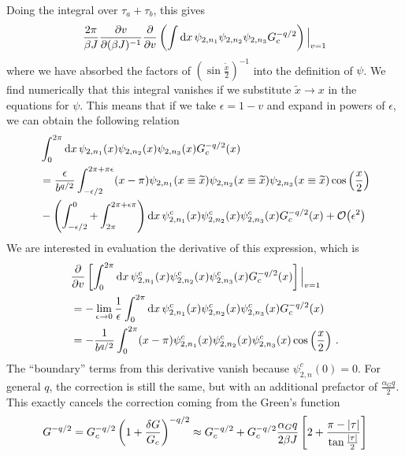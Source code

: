 \documentclass[aps,prx,preprint,onecolumn,citeautoscript,footinbib]{revtex4-1}
\renewcommand{\tilde}{\widetilde}
\begin{document}
Doing the integral over $\tau_a + \tau_b$, this gives
\begin{equation}
    \frac{2\pi}{\beta J} \pdv{v}{(\beta J)^{-1}} \pdv{v}\left( \int \dd{x}  \psi_{2, n_1} \psi_{2, n_2} \psi_{2, n_3} G_c^{-q/2}\right) \Big|_{v=1}
\end{equation}
where we have absorbed the factors of $\left(\sin\frac{\tilde{x}}{2}\right)^{-1}$ into the definition of $\psi$. We find numerically that this integral vanishes if we substitute $\tilde{x} \rightarrow x$ in the equations for $\psi$. 
This means that if we take $\epsilon = 1-v$ and expand in powers of $\epsilon$, we can obtain the following relation
\begin{equation*}
  \begin{aligned}
    &\int_0^{2\pi} \dd{x}  \psi_{2, n_1}(x) \psi_{2, n_2}(x) \psi_{2, n_3}(x) G_c^{-q/2}(x) 
    \\
    &= \frac{\epsilon}{b^{q/2}} \int_{-\epsilon/2}^{2\pi + \pi \epsilon} (x-\pi) \psi_{2, n_1}(x \equiv \tilde{x}) \psi_{2, n_2}(x \equiv \tilde{x})\psi_{2, n_3}(x \equiv \tilde{x})  \cos\left( \frac{x}{2} \right) 
  \\
  &- \left( \int_{-\epsilon/2}^0 + \int_{2\pi}^{2\pi + \epsilon \pi} \right) \dd{x}\psi^c_{2, n_1}(x) \psi_{2, n_2}^c(x)\psi_{2, n_3}^{c}(x)  G_c^{-q/2}(x) + \order{\epsilon^2}
\end{aligned}
\end{equation*}
We are interested in evaluation the derivative of this expression, which is
\begin{equation*}
  \begin{aligned}
    &\pdv{v} \left[\int_0^{2\pi} \dd{x} \psi^c_{2, n_1}(x) \psi_{2, n_2}^c(x)\psi_{2, n_3}^{c}(x)  G_c^{-q/2}(x)\right]\Big|_{v=1} 
    \\
    &= -\lim_{\epsilon \rightarrow 0} \frac{1}{\epsilon}\int_0^{2\pi} \dd{x} \psi^c_{2, n_1}(x) \psi_{2, n_2}^c(x)\psi_{2, n_3}^{c}(x)  G_c^{-q/2}(x) 
    \\
    &= - \frac{1}{b^{q/2}} \int_{0}^{2\pi} (x-\pi) \psi^c_{2, n_1}(x) \psi_{2, n_2}^c(x)\psi_{2, n_3}^{c}(x)  \cos\left( \frac{x}{2} \right)\,.
  \end{aligned}
\end{equation*}
The ``boundary'' terms from this derivative vanish because $\psi^c_{2, n}(0) = 0$. For general $q$, the correction is still the same, but with an additional prefactor of $\frac{\alpha_G q}{2}$. This exactly cancels the correction coming from the Green's function
\begin{equation}
    G^{-q/2} = G_c^{-q/2} \left(1 + \frac{\delta G}{G_c}\right)^{-q/2} \approx G_c^{-q/2} + G_c^{-q/2}\frac{\alpha_G q}{2\beta J} \left[2 + \frac{\pi - \abs{\tau}}{\tan{\frac{\abs{\tau}}{2}}}\right] 
\end{equation}
\end{document}
